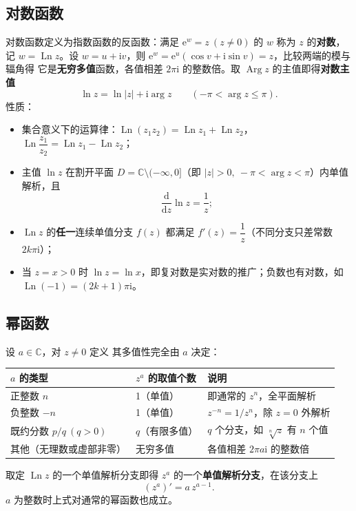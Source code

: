 \subsection{对数函数}
对数函数定义为指数函数的反函数：满足 \(\mathrm{e}^{w}=z\ (z\neq 0)\) 的 \(w\) 称为 \(z\) 的\textbf{对数}，记 \(w=\operatorname{Ln}z\)。设 \(w=u+\mathrm{i}v\)，则 \(\mathrm{e}^{w}=\mathrm{e}^{u}(\cos v+\mathrm{i}\sin v)=z\)，比较两端的模与辐角得
它是\textbf{无穷多值}函数，各值相差 \(2\pi\mathrm{i}\) 的整数倍。取 \(\operatorname{Arg}z\) 的主值即得\textbf{对数主值}
\[
\ln z=\ln|z|+\mathrm{i}\arg z\qquad (-\pi<\arg z\leqslant \pi).
\]
性质：
\begin{itemize}[leftmargin=2em]
  \item 集合意义下的运算律：\(\operatorname{Ln}(z_{1}z_{2})=\operatorname{Ln}z_{1}+\operatorname{Ln}z_{2}\)，\(\operatorname{Ln}\dfrac{z_{1}}{z_{2}}=\operatorname{Ln}z_{1}-\operatorname{Ln}z_{2}\)；
  \item 主值 \(\ln z\) 在割开平面 \(D=\mathbb{C}\setminus(-\infty,0]\)（即 \(|z|>0,\ -\pi<\arg z<\pi\)）内单值解析，且
  \[
  \frac{\mathrm{d}}{\mathrm{d}z}\ln z=\frac{1}{z};
  \]
  \item \(\operatorname{Ln}z\) 的\textbf{任一}连续单值分支 \(f(z)\) 都满足 \(f'(z)=\dfrac{1}{z}\)（不同分支只差常数 \(2k\pi\mathrm{i}\)）；
  \item 当 \(z=x>0\) 时 \(\ln z=\ln x\)，即复对数是实对数的推广；负数也有对数，如 \(\operatorname{Ln}(-1)=(2k+1)\pi\mathrm{i}\)。
\end{itemize}

\subsection{幂函数}
设 \(a\in\mathbb{C}\)，对 \(z\neq 0\) 定义
其多值性完全由 \(a\) 决定：
\begin{center}
\begin{tabular}{lll}
\toprule
\(a\) 的类型 & \(z^{a}\) 的取值个数 & 说明 \\
\midrule
正整数 \(n\) & 1（单值） & 即通常的 \(z^{n}\)，全平面解析 \\
负整数 \(-n\) & 1（单值） & \(z^{-n}=1/z^{n}\)，除 \(z=0\) 外解析 \\
既约分数 \(p/q\ (q>0)\) & \(q\)（有限多值） & \(q\) 个分支，如 \(\sqrt[n]{z}\) 有 \(n\) 个值 \\
其他（无理数或虚部非零） & 无穷多值 & 各值相差 \(2\pi a\mathrm{i}\) 的整数倍 \\
\bottomrule
\end{tabular}
\end{center}
取定 \(\operatorname{Ln}z\) 的一个单值解析分支即得 \(z^{a}\) 的一个\textbf{单值解析分支}，在该分支上
\[
(z^{a})'=a\,z^{a-1}.
\]
\(a\) 为整数时上式对通常的幂函数也成立。


